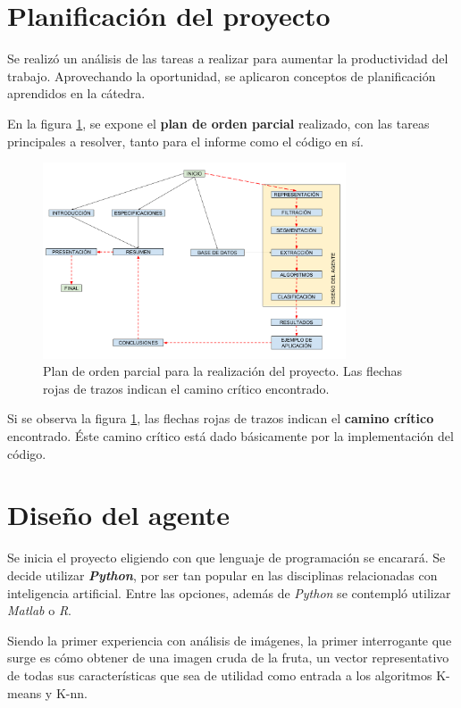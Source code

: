 \documentclass[10pt,a4paper]{article}
\begin{document}
\section{Planificación del proyecto}
Se realizó un análisis de las tareas a realizar para aumentar la productividad del trabajo. Aprovechando la oportunidad, se aplicaron conceptos de planificación aprendidos en la cátedra.

En la figura \ref{plan-parcial}, se expone el \textbf{plan de orden parcial} realizado, con las tareas principales a resolver, tanto para el informe como el código en sí.

\begin{figure}[h]
\centering
\includegraphics[width=0.8\textwidth]{imgs/plan-parcial.png}
\caption{Plan de orden parcial para la realización del proyecto. Las flechas rojas de trazos indican el camino crítico encontrado.}
\label{plan-parcial}
\end{figure}

Si se observa la figura \ref{plan-parcial}, las flechas rojas de trazos indican el \textbf{camino crítico} encontrado. Éste camino crítico está dado básicamente por la implementación del código.

\section{Diseño del agente}
Se inicia el proyecto eligiendo con que lenguaje de programación se encarará. Se decide utilizar \textbf{\textit{Python}}, por ser tan popular en las disciplinas relacionadas con inteligencia artificial. Entre las opciones, además de \textit{Python} se contempló utilizar \textit{Matlab} o \textit{R}.

Siendo la primer experiencia con análisis de imágenes, la primer interrogante que surge es cómo obtener de una imagen cruda de la fruta, un vector representativo de todas sus características que sea de utilidad como entrada a los algoritmos K-means y K-nn.
\end{document}

